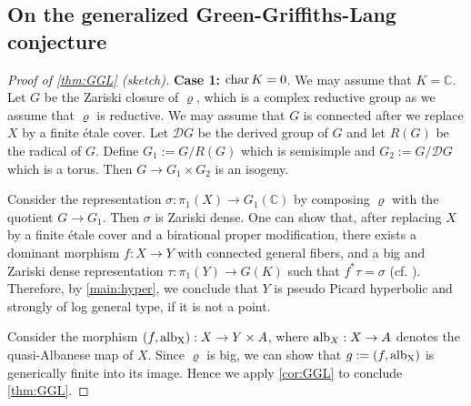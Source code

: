 \documentclass[english]{amsproc}
\theoremstyle{plain}
\theoremstyle{definition}
\theoremstyle{remark}
\theoremstyle{plain}
\numberwithin{equation}{thm} %
\newcommand{\cD}{\mathcal D}
\newcommand{\bC}{\mathbb{C}}
\begin{document}
	
	
	
	
	
	
	
	\subsection{On the generalized Green-Griffiths-Lang conjecture}\label{subsec:20230427}
	
	\begin{proof}[Proof of \cref{thm:GGL} (sketch)]
		
		\noindent \textbf{Case 1: ${\rm char}\, K=0$}.  
		We may assume that $K=\bC$. Let $G$ be the Zariski closure of $\varrho$, which is a complex reductive group as we assume that $\varrho$ is reductive. We may assume that $G$ is connected after we replace $X$ by a finite \'etale cover. Let $\cD G$ be the derived group of $G$ and let $R(G)$ be the radical of $G$. Define $G_1:=G/R(G)$ which is semisimple and $G_2:=G/\cD G$ which is a torus.  Then $G\to G_1\times G_2$ is  an isogeny. 
		
		Consider the representation $\sigma:\pi_1(X)\to G_1(\bC)$ by composing $\varrho$ with the quotient $G\to G_1$. Then $\sigma$ is Zariski dense.  One can show that,  after replacing $X$ by a finite \'etale cover and a birational proper modification, there exists a dominant morphism $f:X\to Y$ with connected general fibers, and  a big and Zariski dense representation \(\tau : \pi_{1}(Y) \to G(K)\) such that  $f^*\tau=\sigma$ (cf. \cite[Proposition 2.5]{CDY22}).     Therefore, by \cref{main:hyper}, we conclude that $Y$ is pseudo Picard hyperbolic and strongly of log general type, if it is not a point.  
		
		Consider the morphism $(f,{\rm alb_X}):X\to Y\times A$, where ${\rm alb}_X:X\to A$ denotes the quasi-Albanese map of $X$.  Since $\varrho$ is big, we can show that $g:=(f,{\rm alb_X})$  is generically finite into its image. Hence we apply \cref{cor:GGL} to conclude \cref{thm:GGL}.
		

\end{proof}
\end{document}
